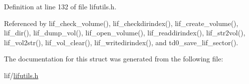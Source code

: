 Definition at line 132 of file lifutils.\+h.



Referenced by lif\+\_\+check\+\_\+volume(), lif\+\_\+checkdirindex(), lif\+\_\+create\+\_\+volume(), lif\+\_\+dir(), lif\+\_\+dump\+\_\+vol(), lif\+\_\+open\+\_\+volume(), lif\+\_\+readdirindex(), lif\+\_\+str2vol(), lif\+\_\+vol2str(), lif\+\_\+vol\+\_\+clear(), lif\+\_\+writedirindex(), and td0\+\_\+save\+\_\+lif\+\_\+sector().



The documentation for this struct was generated from the following file\+:\begin{DoxyCompactItemize}
\item 
lif/\hyperlink{lifutils_8h}{lifutils.\+h}\end{DoxyCompactItemize}
